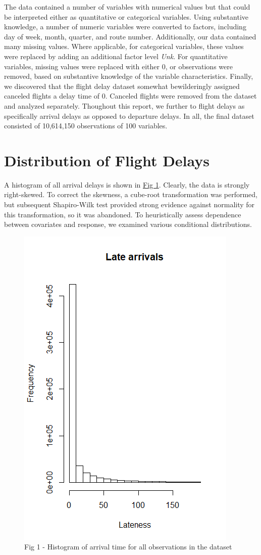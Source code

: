 \documentclass[12pt, a4paper]{book}
\newcommand\tab[1][1cm]{\hspace*{#1}}
\begin{document}
	\tab The data contained a number of variables with numerical values but that could be interpreted either as quantitative or categorical variables. Using substantive knowledge, a number of numeric variables were converted to factors, including day of week, month, quarter, and route number. Additionally, our data contained many missing values. Where applicable, for categorical variables, these values were replaced by adding an additional factor level \textit{Unk}. For quantitative variables, missing values were replaced with either 0, or observations were removed, based on substantive knowledge of the variable characteristics. Finally, we discovered that the flight delay dataset somewhat bewilderingly assigned canceled flights a delay time of 0. Canceled flights were removed from the dataset and analyzed separately. Thoughout this report, we further to flight delays as specifically arrival delays as opposed to departure delays. In all, the final dataset consisted of 10,614,150 observations of 100 variables. 
	
	\section{Distribution of Flight Delays}
	
	\tab A histogram of all arrival delays is shown in \underline{Fig 1}. Clearly, the data is strongly right-skewed. To correct the skewness, a cube-root transformation was performed, but subsequent Shapiro-Wilk test provided strong evidence against normality for this transformation, so it was abandoned. To heuristically assess dependence between covariates and response, we examined various conditional distributions.\\
	\begin{figure}
	\centering
	 \includegraphics[width = .45 \textwidth]{../figures/LateArrivalsHistogram}
	 \caption{Fig 1 - Histogram of arrival time for all observations in the dataset}
	 \end{figure}
	 
\end{document}
